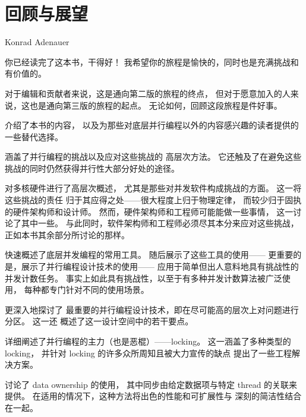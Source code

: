 
\chapter{回顾与展望}
\label{chp:Looking Forward and Back}
%
	  {Konrad Adenauer}

你已经读完了这本书，干得好！
我希望你的旅程是愉快的，同时也是充满挑战和有价值的。

对于编辑和贡献者来说，这是通向第二版的旅程的终点，
但对于愿意加入的人来说，这也是通向第三版的旅程的起点。
无论如何，回顾这段旅程是件好事。

介绍了本书的内容，
以及为那些对底层并行编程以外的内容感兴趣的读者提供的一些替代选择。

涵盖了并行编程的挑战以及应对这些挑战的
高层次方法。
它还触及了在避免这些挑战的同时仍然获得并行性大部分好处的途径。

对多核硬件进行了高层次概述，
尤其是那些对并发软件构成挑战的方面。
这一将这些挑战的责任
归于其应得之处——很大程度上归于物理定律，
而较少归于固执的硬件架构师和设计师。
然而，硬件架构师和工程师可能能做一些事情，
这一讨论了其中一些。
与此同时，软件架构师和工程师必须尽其本分来应对这些挑战，
正如本书其余部分所讨论的那样。

快速概述了底层并发编程的常用工具。
随后展示了这些工具的使用——
更重要的是，展示了并行编程设计技术的使用——
应用于简单但出人意料地具有挑战性的并发计数任务。
事实上如此具有挑战性，以至于有多种并发计数算法被广泛使用，
每种都专门针对不同的使用场景。

更深入地探讨了
最重要的并行编程设计技术，即在尽可能高的层次上对问题进行分区。
这一还
概述了这一设计空间中的若干要点。

详细阐述了并行编程的主力（也是恶棍）——locking。
这一涵盖了多种类型的 locking，
并针对 locking 的许多众所周知且被大力宣传的缺点
提出了一些工程解决方案。

讨论了 data ownership 的使用，
其中同步由给定数据项与特定 thread 的关联来提供。
在适用的情况下，这种方法将出色的性能和可扩展性与
深刻的简洁性结合在一起。

